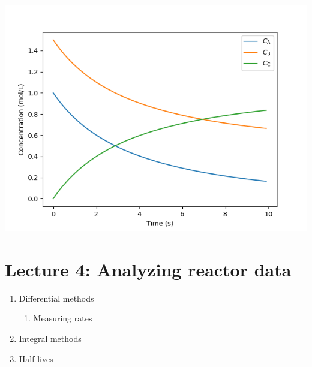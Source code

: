 \documentclass[11pt]{article}
\begin{document}
\begin{center}
\includegraphics[width=.9\linewidth]{./conc.png}
\end{center}

\section{Lecture 4: Analyzing reactor data}
\label{sec:orge3dba3a}
\begin{enumerate}
\item Differential methods
\begin{enumerate}
\item Measuring rates
\end{enumerate}
\item Integral methods
\item Half-lives
\end{enumerate}
\end{document}
